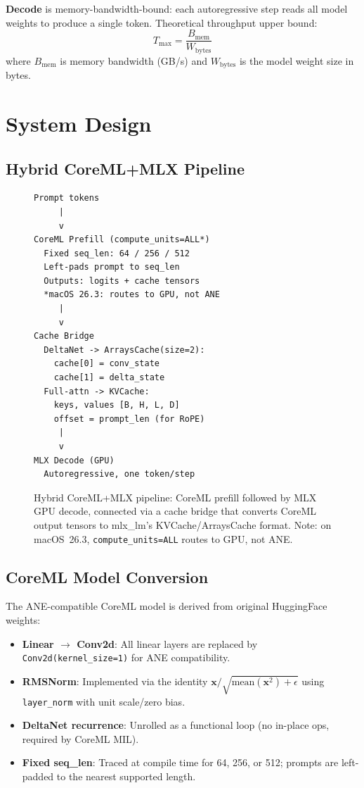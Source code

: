 \documentclass[11pt]{article}
\begin{document}
\textbf{Decode} is memory-bandwidth-bound: each autoregressive step reads all
model weights to produce a single token.
Theoretical throughput upper bound:
\begin{equation}
  T_{\max} = \frac{B_{\text{mem}}}{W_{\text{bytes}}}
  \label{eq:bw_bound}
\end{equation}
where $B_{\text{mem}}$ is memory bandwidth (GB/s) and $W_{\text{bytes}}$ is
the model weight size in bytes.

\section{System Design}
\label{sec:design}

\subsection{Hybrid CoreML+MLX Pipeline}

\begin{figure}[t]
\begin{lstlisting}
Prompt tokens
     |
     v
CoreML Prefill (compute_units=ALL*)
  Fixed seq_len: 64 / 256 / 512
  Left-pads prompt to seq_len
  Outputs: logits + cache tensors
  *macOS 26.3: routes to GPU, not ANE
     |
     v
Cache Bridge
  DeltaNet -> ArraysCache(size=2):
    cache[0] = conv_state
    cache[1] = delta_state
  Full-attn -> KVCache:
    keys, values [B, H, L, D]
    offset = prompt_len (for RoPE)
     |
     v
MLX Decode (GPU)
  Autoregressive, one token/step
\end{lstlisting}
\caption{Hybrid CoreML+MLX pipeline: CoreML prefill followed by MLX GPU decode,
  connected via a cache bridge that converts CoreML output tensors to
  mlx\_lm's KVCache/ArraysCache format.
  Note: on macOS~26.3, \texttt{compute\_units=ALL} routes to GPU, not ANE.}
\label{fig:pipeline}
\end{figure}

\subsection{CoreML Model Conversion}

The ANE-compatible CoreML model is derived from original HuggingFace weights:
\begin{itemize}[topsep=2pt,itemsep=1pt]
  \item \textbf{Linear $\to$ Conv2d}: All linear layers are replaced by
    \texttt{Conv2d(kernel\_size=1)} for ANE compatibility.
  \item \textbf{RMSNorm}: Implemented via the identity
    $\mathbf{x}/\sqrt{\text{mean}(\mathbf{x}^2)+\epsilon}$ using
    \texttt{layer\_norm} with unit scale/zero bias.
  \item \textbf{DeltaNet recurrence}: Unrolled as a functional loop
    (no in-place ops, required by CoreML MIL).
  \item \textbf{Fixed seq\_len}: Traced at compile time for 64, 256, or 512;
    prompts are left-padded to the nearest supported length.
\end{itemize}
\end{document}
